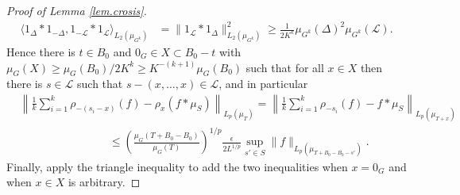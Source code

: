 \documentclass[12pt,reqno]{amsart}
\numberwithin{equation}{section}
\begin{document}
\begin{proof}[Proof of Lemma \ref{lem.crosis}]
\begin{align*}
 \langle 1_{\Delta} \ast 1_{-\Delta},1_{-\mathcal{L}} \ast 1_{\mathcal{L}}\rangle_{L_2(\mu_{G^k})} & = \|  1_\mathcal{L}\ast 1_\Delta \|_{L_2(\mu_{G^k})}^2\geq \frac{1}{2K^k}\mu_{G^k}(\Delta)^2\mu_{G^k}(\mathcal{L}).
\end{align*}
Hence there is $t \in {B_0}$ and $0_G \in X \subset {B_0}-t$ with $\mu_G(X) \geq \mu_G({B_0})/2K^k\geq K^{-(k+1)}\mu_G({B_0})$ such that for all $x \in X$ then there is $s \in \mathcal{L}$ such that $s-(x,\dots,x) \in \mathcal{L}$, and in particular
\begin{align*}
& \left\|\frac{1}{k}\sum_{i=1}^k{\rho_{-(s_i-x)}(f)} -  \rho_x(f \ast \mu_{S})\right\|_{L_p(\mu_{T})} = \left\|\frac{1}{k}\sum_{i=1}^k{\rho_{-s_i}(f)}- f \ast \mu_{S} \right\|_{L_p(\mu_{T+x})}\\ & \qquad\qquad\qquad\qquad\leq \left(\frac{\mu_G(T+{B_0}-{B_0})}{\mu_G(T)}\right)^{1/p}\frac{\epsilon}{2L^{1/p}}\sup_{s' \in S}{\|f\|_{L_p(\mu_{T+{B_0}-{B_0}-s'})}}.
\end{align*}
Finally, apply the triangle inequality to add the two inequalities when $x=0_G$ and when $x \in X$ is arbitrary.
\end{proof}




\end{document}
